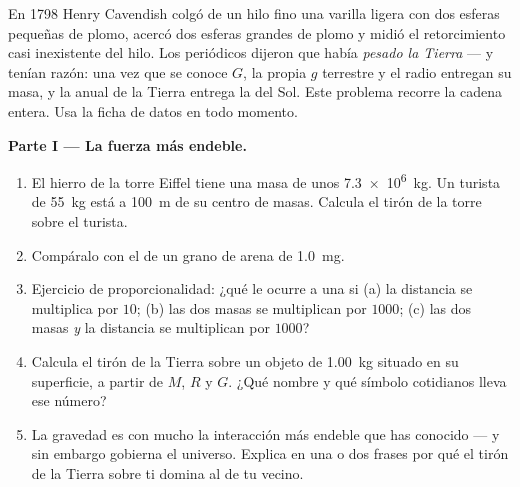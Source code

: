 \begin{problem}
\label{pb:g10:universal-gravitation:1}
En 1798 Henry Cavendish colgó de un hilo fino una varilla ligera con dos
esferas pequeñas de plomo, acercó dos esferas grandes de plomo y midió
el retorcimiento casi inexistente del hilo. Los periódicos dijeron que
había \emph{pesado la Tierra} --- y tenían razón: una vez que se conoce
$G$, la propia $g$ terrestre y el radio entregan su masa, y la 
anual de la Tierra entrega la del Sol. Este problema recorre la cadena
entera. Usa la ficha de datos en todo momento.

\medskip
\noindent\textbf{Parte I --- La fuerza más endeble.}
\begin{enumerate}
  \item El hierro de la torre Eiffel tiene una masa de unos
        \qty{7.3e6}{kg}. Un turista de \qty{55}{kg} está a \qty{100}{m}
        de su centro de masas. Calcula el tirón de la torre sobre el
        turista.
  \item Compáralo con el  de un grano de arena de \qty{1.0}{mg}.
  \item Ejercicio de proporcionalidad: ¿qué le ocurre a una  si (a) la distancia se multiplica por $10$; (b) las
        dos masas se multiplican por $1000$; (c) las dos masas \emph{y}
        la distancia se multiplican por $1000$?
  \item Calcula el tirón de la Tierra sobre un objeto de \qty{1.00}{kg}
        situado en su superficie, a partir de $M$, $R$ y $G$. ¿Qué
        nombre y qué símbolo cotidianos lleva ese número?
  \item La gravedad es con mucho la interacción más endeble que has
        conocido --- y sin embargo gobierna el universo. Explica en una
        o dos frases por qué el tirón de la Tierra sobre ti domina al de
        tu vecino.
\end{enumerate}


\end{problem}
